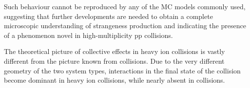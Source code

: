 \documentclass[ALICE,manyauthors]{StrinJet}
\begin{document}
Such behaviour cannot be reproduced by any of the MC models commonly used, suggesting that further developments are needed to obtain a complete microscopic understanding of strangeness production and indicating the presence of a phenomenon novel in high-multiplicity pp collisions.




The theoretical picture of collective effects in heavy ion collisions is vastly different from the picture known from \pp collisions. Due to the very different geometry of the two system types, interactions in the final state of the collision become dominant in heavy ion collisions, while nearly absent in \pp collisions.
\end{document}
